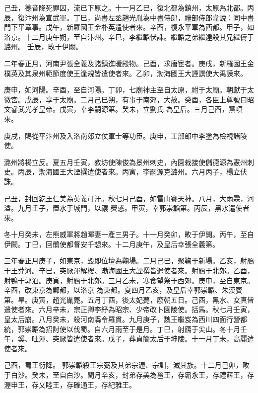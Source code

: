 \begin{pinyinscope}
 己丑，德音降死罪囚，流已下原之。十一月乙巳，復北都為鎮州，太原為北都。丙辰，復汴州為宣武軍。丁巳，尚書左丞趙光胤為中書侍郎，禮部侍郎韋說：同中書門下平章事。戊午，新羅國王金朴英遣使者來。辛酉，復永平軍為西都。甲子，如洛京。十二月庚午朔，至自汴州。辛巳，李繼韜伏誅。繼韜之弟繼達殺其兄繼儔于潞州。
 壬辰，畋于伊闕。



 二年春正月，河南尹張全義及諸鎮進暖殿物。己酉，求唐宦者。庚戌，新羅國王金樸英及其泉州範節度使王逢規皆遣使者來。乙卯，渤海國王大諲譔使大禹謨來。



 庚申，如河陽。辛酉，至自河陽。丁卯，七廟神主至自太原，祔于太廟。朝獻于太微宮。戊辰，享于太廟。二月己巳朔，有事于南郊，大赦。癸酉，各臣上尊號曰昭文睿武光孝皇帝。戊寅，幸李嗣源第。癸未，立劉氏
 為皇后。三月己酉，黨項來。



 庚戌，賜從平汴州及入洛南郊立仗軍士等功臣。庚申，工部郎中李塗為檢視諸陵使。



 潞州將楊立反。夏五月壬寅，教坊使陳俊為景州刺史，內園栽接使儲德源為憲州刺史。丙辰，渤海國王大湮撰遣使者來。丙寅，李嗣源克潞州。六月丙子，楊立伏誅。



 己丑，封回紇王仁美為英義可汗。秋七月己酉，如雷山賽天神。八月，大雨霖，河溢。九月壬子，置水于城門，以禳
 熒惑。甲寅，幸郭崇韜第。丙辰，黑水遣使者來。



 冬十月癸未，左熊威軍將趙暉妻一產三男子。十一月癸卯，畋于伊闕。丙午，至自伊闕。丁巳，回鶻使都督安千想來。十二月庚午，及皇后幸張全義第。



 三年春正月庚子，如東京，毀即位壇為鞠場。二月己巳，聚鞠于新場。乙亥，射鴈于王莽河。辛巳，突厥渾解樓、渤海國王大諲撰皆遣使者來。射鴈于北郊。乙酉，射鴨于郭泊。庚寅，射鴈于北郊。三月乙未，寒食望祭于西郊。庚申，至自東京。辛酉，改東京為鄴都，以洛京
 為東都。夏四月乙亥，及皇后幸郭崇韜、朱漢賓第。旱。庚寅，趙光胤薨。五月丁酉，後太妃薨，廢朝五日。己酉，黑水、女真皆遣使者來。六月辛未，宗正卿李紓為昭宗、少帝改卜園陵使。括馬。秋七月壬寅，皇太后崩。八月癸未，殺河南縣令羅貫。九月庚子，魏王繼岌為西川四面行營都統，郭崇韜為招討使以伐蜀。自六月雨至于是月。丁巳，射鴈于尖山。冬十月壬午，奚、吐渾、突厥皆遣使者來。戊子，葬貞簡太后于坤陵。十一月丁未，高麗遣使者來。



 己酉，蜀王衍降。
 郭崇韜殺王宗弼及其弟宗渥、宗訓，滅其族。十二月己卯，畋于白沙。癸未，至自白沙。閏月辛亥，封弟存美為邕王，存霸永王，存禮薛王，存渥申王，存乂睦王，存確通王，存紀雅王。




\end{pinyinscope}
